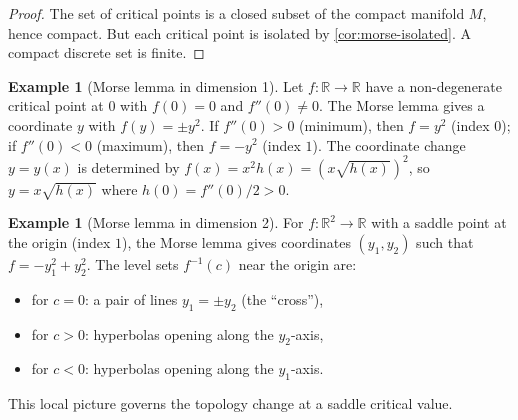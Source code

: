 \documentclass[12pt,a4paper,openany]{book}
\theoremstyle{definition}
\newtheorem{example}[theorem]{Example}
\theoremstyle{remark}
\newcommand{\R}{\mathbb{R}}
\begin{document}
\begin{proof}
The set of critical points is a closed subset of the compact
manifold $M$, hence compact. But each critical point is isolated
by \autoref{cor:morse-isolated}. A compact discrete set is finite.
\end{proof}

\begin{example}[Morse lemma in dimension 1]\label{ex:morse-lemma-dim1}
Let $f\colon \R \to \R$ have a non-degenerate critical point at $0$
with $f(0)=0$ and $f''(0) \neq 0$. The Morse lemma gives a
coordinate $y$ with $f(y) = \pm y^2$. If $f''(0)>0$ (minimum),
then $f = y^2$ (index $0$); if $f''(0)<0$ (maximum), then $f = -y^2$ (index $1$).
The coordinate change $y = y(x)$ is determined by
$f(x) = x^2 h(x) = (x\sqrt{h(x)})^2$, so $y = x\sqrt{h(x)}$
where $h(0) = f''(0)/2 > 0$.
\end{example}

\begin{example}[Morse lemma in dimension 2]\label{ex:morse-lemma-dim2}
For $f\colon \R^2 \to \R$ with a saddle point at the origin (index $1$),
the Morse lemma gives coordinates $(y_1,y_2)$ such that
$f = -y_1^2 + y_2^2$. The level sets $f^{-1}(c)$ near the origin are:
\begin{itemize}
  \item for $c = 0$: a pair of lines $y_1 = \pm y_2$ (the ``cross''),
  \item for $c > 0$: hyperbolas opening along the $y_2$-axis,
  \item for $c < 0$: hyperbolas opening along the $y_1$-axis.
\end{itemize}
This local picture governs the topology change at a saddle critical value.
\end{example}
\end{document}
